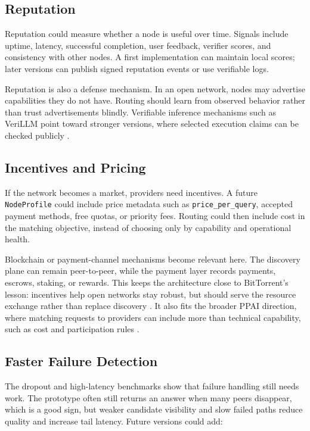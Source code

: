 \subsection{Reputation}

Reputation could measure whether a node is useful over time. Signals include
uptime, latency, successful completion, user feedback, verifier scores, and
consistency with other nodes. A first implementation can maintain local scores;
later versions can publish signed reputation events or use verifiable logs.

Reputation is also a defense mechanism. In an open network, nodes may advertise
capabilities they do not have. Routing should learn from observed behavior
rather than trust advertisements blindly. Verifiable inference mechanisms such
as VeriLLM point toward stronger versions, where selected execution claims can
be checked publicly
\citep{wang2026verillm}.

\subsection{Incentives and Pricing}

If the network becomes a market, providers need incentives. A future
\texttt{NodeProfile} could include price metadata such as
\texttt{price\_per\_query}, accepted payment methods, free quotas, or priority
fees. Routing could then include cost in the matching objective, instead of
choosing only by capability and operational health.

Blockchain or payment-channel mechanisms become relevant here. The discovery
plane can remain peer-to-peer, while the payment layer records payments,
escrows, staking, or rewards. This keeps the architecture close to BitTorrent's
lesson: incentives help open networks stay robust, but should serve the
resource exchange rather than replace discovery \citep{cohen2003bittorrent}.
It also fits the broader PPAI direction, where matching requests to providers
can include more than technical capability, such as cost and participation
rules \citep{wang2026ppai}.

\subsection{Faster Failure Detection}

The dropout and high-latency benchmarks show that failure handling still needs
work. The prototype often still returns an answer when many peers disappear,
which is a good sign, but weaker candidate visibility and slow failed paths
reduce quality and increase tail latency. Future versions could add:


